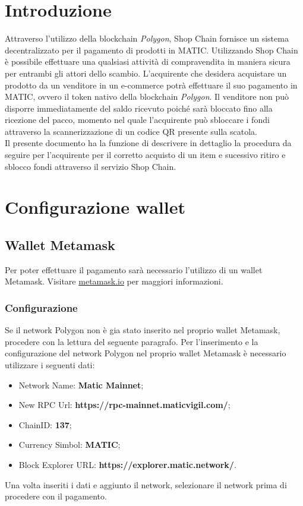 \documentclass[a4paper, 12pt]{article}
\begin{document}
\makefrontpage
\tableofcontents
\newpage

\section{Introduzione}
Attraverso l'utilizzo della blockchain \textit{Polygon}, Shop Chain fornisce un sistema decentralizzato per il pagamento di prodotti in MATIC. Utilizzando Shop Chain è possibile effettuare una qualsiasi attività di compravendita in maniera sicura per entrambi gli attori dello scambio. L'acquirente che desidera acquistare un prodotto da un venditore in un e-commerce potrà effettuare il suo pagamento in MATIC, ovvero il token nativo della blockchain \textit{Polygon}. Il venditore non può disporre immediatamente del saldo ricevuto poiché sarà bloccato fino alla ricezione del pacco, momento nel quale l'acquirente può sbloccare i fondi attraverso la scannerizzazione di un codice QR presente sulla scatola.\\
Il presente documento ha la funzione di descrivere in dettaglio la procedura da seguire per l'acquirente per il corretto acquisto di un item e sucessivo ritiro e sblocco fondi attraverso il servizio Shop Chain.


\section{Configurazione wallet}
\subsection{Wallet Metamask}
Per poter effettuare il pagamento sarà necessario l'utilizzo di un wallet Metamask. Visitare \href{https://www.metamask.io}{metamask.io} per maggiori informazioni.
\subsubsection{Configurazione}
Se il network Polygon non è gia stato inserito nel proprio wallet Metamask, procedere con la lettura del seguente paragrafo.
Per l'inserimento e la configurazione del network Polygon nel proprio wallet Metamask è necessario utilizzare i seguenti dati:
\begin{itemize}
\item Network Name: \textbf{Matic Mainnet};
\item New RPC Url: \textbf{https://rpc-mainnet.maticvigil.com/};
\item ChainID: \textbf{137};
\item Currency Simbol: \textbf{MATIC};
\item Block Explorer URL: \textbf{https://explorer.matic.network/}.
\end{itemize}
Una volta inseriti i dati e aggiunto il network, selezionare il network prima di procedere con il pagamento.
\end{document}
